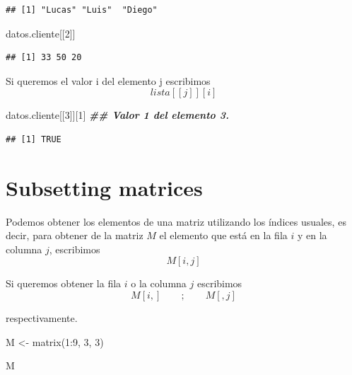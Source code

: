\documentclass[
  12pt,
]{book}
\newenvironment{Shaded}{\begin{snugshade}}{\end{snugshade}}
\newcommand{\DecValTok}[1]{\textcolor[rgb]{0.00,0.00,0.81}{#1}}
\newcommand{\DocumentationTok}[1]{\textcolor[rgb]{0.56,0.35,0.01}{\textbf{\textit{#1}}}}
\newcommand{\FunctionTok}[1]{\textcolor[rgb]{0.00,0.00,0.00}{#1}}
\newcommand{\NormalTok}[1]{#1}
\newcommand{\OtherTok}[1]{\textcolor[rgb]{0.56,0.35,0.01}{#1}}
\newcommand{\SpecialCharTok}[1]{\textcolor[rgb]{0.00,0.00,0.00}{#1}}
\begin{document}
\begin{verbatim}
## [1] "Lucas" "Luis"  "Diego"
\end{verbatim}

\begin{Shaded}
\begin{Highlighting}[]
\NormalTok{datos.cliente[[}\DecValTok{2}\NormalTok{]]}
\end{Highlighting}
\end{Shaded}

\begin{verbatim}
## [1] 33 50 20
\end{verbatim}

Si queremos el valor i del elemento j escribimos \[lista[[j]][i]\]

\begin{Shaded}
\begin{Highlighting}[]
\NormalTok{datos.cliente[[}\DecValTok{3}\NormalTok{]][}\DecValTok{1}\NormalTok{] }\DocumentationTok{\#\# Valor 1 del elemento 3.}
\end{Highlighting}
\end{Shaded}

\begin{verbatim}
## [1] TRUE
\end{verbatim}

\hypertarget{subsetting-matrices}{%
\section{\texorpdfstring{\textbf{Subsetting matrices}}{Subsetting matrices}}\label{subsetting-matrices}}

Podemos obtener los elementos de una matriz utilizando los índices usuales, es decir, para obtener de la matriz \(M\) el elemento que está en la fila \(i\) y en la columna \(j\), escribimos
\[
M[i,j]
\]

Si queremos obtener la fila \(i\) o la columna \(j\) escribimos
\[
M[i,] \qquad; \qquad M[,j]
\]

respectivamente.

\begin{Shaded}
\begin{Highlighting}[]
\NormalTok{M }\OtherTok{\textless{}{-}} \FunctionTok{matrix}\NormalTok{(}\DecValTok{1}\SpecialCharTok{:}\DecValTok{9}\NormalTok{, }\DecValTok{3}\NormalTok{, }\DecValTok{3}\NormalTok{)}

\NormalTok{M}
\end{Highlighting}
\end{Shaded}
\end{document}
